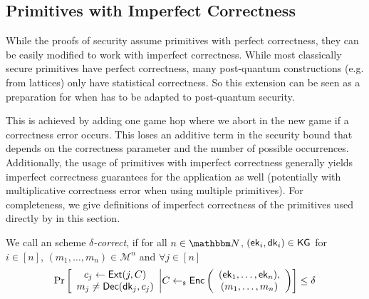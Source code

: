 \subsection{Primitives with Imperfect Correctness}
While the proofs of \saik security assume primitives with perfect correctness, they can be easily modified to work with
imperfect correctness. While most classically secure primitives have perfect correctness, many post-quantum
constructions (e.g. from lattices) only have statistical correctness. So this extension can be seen as a preparation for
when \saik has to be adapted to post-quantum security.

This is achieved by adding one game hop where we
abort in the new game if a correctness error occurs. This loses an additive term in the security bound that depends on
the correctness parameter and the number of possible occurrences. Additionally, the usage of primitives with imperfect
correctness generally yields imperfect correctness guarantees for the application as well (potentially with
multiplicative correctness error when using multiple primitives). For completeness, we give definitions of imperfect
correctness of the primitives used directly by \saik in this section.

\begin{definition}
We call an \mmPKE scheme \emph{$\delta$-correct}, if for all $n\in \N$, $({\mathsf{ek}}_i,{\mathsf{dk}}_i)\in
  {\ensuremath{\mathsf{KG}}} $ for $i\in[n]$,
  $(m_1,\ldots, m_n)\in\mathcal{M}^n$ and $\forall j\in[n]$
  \[
    \Pr\left[
      \begin{array}{c}
        c_j\gets {\ensuremath{\mathsf{Ext}}}(j, C)\\
        m_j \neq {\ensuremath{\mathsf{Dec}}}({\mathsf{dk}}_j, c_j)
      \end{array}
      \middle\vert
      C \gets_{\scriptscriptstyle\$} {\mathsf{Enc}}\left(
      \begin{array}{c}
        ({\mathsf{ek}}_1,\ldots, {\mathsf{ek}}_n),\\(m_1,\ldots,m_n)
      \end{array}
      \right)
    \right] \leq \delta
  \]
\end{definition}

